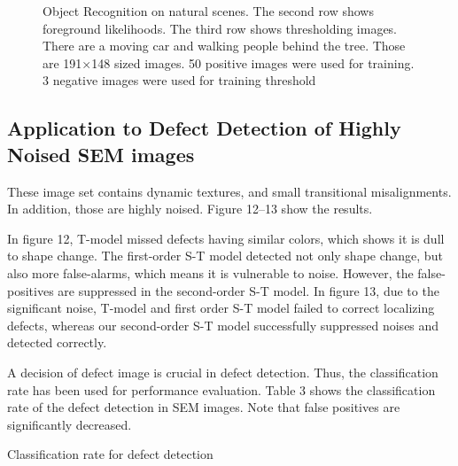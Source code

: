 \documentclass[a4paper,twocolumn, 10pt]{article}
\begin{document}
\begin{figure}[t]
  \hfill
  \hfill
  \caption{Object Recognition on natural scenes. The second row shows foreground likelihoods. The third row shows thresholding images. There are a moving car and walking people behind the tree. Those are 191×148 sized images. 50 positive images were used for training. 3 negative images were used for training threshold}
\end{figure}

\subsection{Application to Defect Detection of Highly Noised SEM images}
These image set contains dynamic textures, and small transitional misalignments. In addition, those are highly noised. Figure 12–13 show the results. 

In figure 12, T-model missed defects having similar colors, which shows it is dull to shape change. The first-order S-T model detected not only shape change, but also more false-alarms, which means it is vulnerable to noise. However, the false-positives are suppressed in the second-order S-T model. In figure 13, due to the significant noise, T-model and first order S-T model failed to correct localizing defects, whereas our second-order S-T model successfully suppressed noises and detected correctly.

A decision of defect image is crucial in defect detection. Thus, the classification rate has been used for performance evaluation. Table 3 shows the classification rate of the defect detection in SEM images. Note that false positives are significantly decreased.

\begin{table}[t]
  \centering
  \label{tab10}
  \caption{Classification rate for defect detection}
\end{table}
\end{document}
